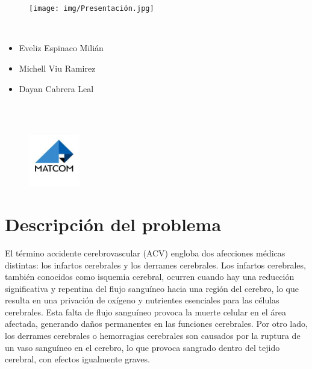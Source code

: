 \documentclass[a4paper, 12pt]{article}
\begin{document}
\graphicspath{{./}}

\begin{center}
\\
\vspace {1cm}
\\

\begin{figure}[H]
    \centering
    \texttt{[image: img/Presentación.jpg]}
\end{figure}

\\
\begin{itemize}
\centering
\item Eveliz Espinaco Milián
\item Michell Viu Ramirez
\item Dayan Cabrera Leal
\end{itemize}
\vspace {0.5cm}
\\
\\

\begin{figure}[H]
    \centering
    \includegraphics[width=0.2\textwidth]{img/MATCOM.jpg}
\end{figure}



\end{center}

\newpage
\tableofcontents

\newpage
\section{Descripción del problema}
El término accidente cerebrovascular (ACV) engloba dos afecciones médicas distintas: los infartos cerebrales y los derrames cerebrales. Los infartos cerebrales, también conocidos como isquemia cerebral, ocurren cuando hay una reducción significativa y repentina del flujo sanguíneo hacia una región del cerebro, lo que resulta en una privación de oxígeno y nutrientes esenciales para las células cerebrales. Esta falta de flujo sanguíneo provoca la muerte celular en el área afectada, generando daños permanentes en las funciones cerebrales. Por otro lado, los derrames cerebrales o hemorragias cerebrales son causados por la ruptura de un vaso sanguíneo en el cerebro, lo que provoca sangrado dentro del tejido cerebral, con efectos igualmente graves.
\end{document}
